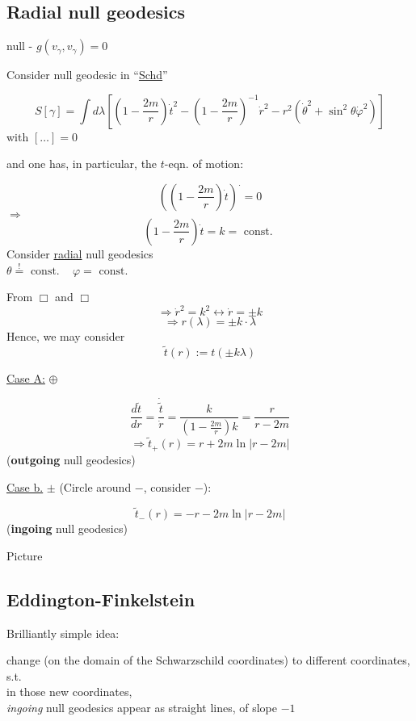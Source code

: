 \subsection{Radial null geodesics}

null - $g(v_{\gamma},v_{\gamma} ) = 0$

Consider null geodesic in ``\underline{Schd}''

\[
S[\gamma ] = \int d\lambda \left[ \left( 1 - \frac{2m}{r} \right)\dot{t}^2 - \left(1 - \frac{2m}{r} \right)^{-1} \dot{r}^2 - r^2( \dot{\theta}^2 + \sin^2{\theta} \dot{\varphi}^2 ) \right]
\]
with $[\dots ] =0$

and one has, in particular, the $t$-eqn. of motion:

\[
\left( \left( 1-  \frac{2m}{r} \right) \dot{t} \right)^{.} = 0
\]
$\Longrightarrow$
\[
\boxed{ \left( 1 - \frac{2m}{r} \right)\dot{t} = k } = \text{ const. }
\]
Consider \underline{radial} null geodesics \\
$\theta \overset{!}{=} \text{ const. }$ \quad \quad \, $\varphi = \text{ const. }$

From $\Box $ and $\Box $
\[
\Longrightarrow \dot{r}^2 = k^2 \leftrightarrow \dot{r} = \pm k
\]
\[
\Longrightarrow r(\lambda) = \pm k \cdot \lambda
\]
Hence, we may consider 
\[
\widetilde{t}(r) := t(\pm k\lambda)
\]

\underline{Case A:} $\oplus$

\[
\frac{d\widetilde{t}}{dr} = \frac{ \dot{ \widetilde{t}} }{ \dot{r}} = \frac{k}{ \left( 1 - \frac{2m}{r} \right) k } = \frac{r}{r-2m}
\]
\[
\Longrightarrow \widetilde{t}_+(r) = r + 2m \ln{ |r-2m | }
\]
(\textbf{outgoing} null geodesics)

\underline{Case b.} $\pm$ (Circle around $-$, consider $-$):

\[
\widetilde{t}_-(r) = -r - 2m \ln{ |r - 2m | }
\]
(\textbf{ingoing} null geodesics)

Picture

\subsection{Eddington-Finkelstein}

Brilliantly simple idea: 

change (on the domain of the Schwarzschild coordinates) to different coordinates, s.t.  \\ 
in those new coordinates, \\
\emph{ingoing} null geodesics appear as straight lines, of slope $-1$ 

